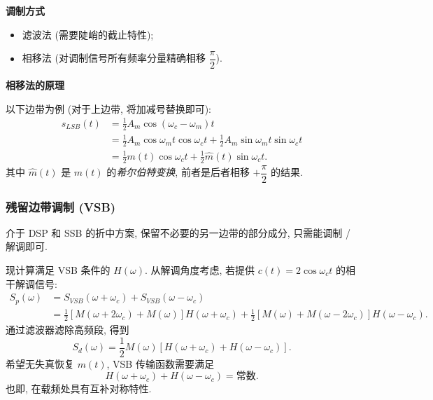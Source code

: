 \textbf{调制方式}
\begin{itemize}
    \item 滤波法 (需要陡峭的截止特性);
    \item 相移法 (对调制信号所有频率分量精确相移 $\dfrac{\pi}{2}$).
\end{itemize}

\textbf{相移法的原理}

以下边带为例 (对于上边带, 将加减号替换即可):
\begin{equation}
    \begin{aligned}
        s_{LSB}(t) & =\frac{1}{2}A_m\cos(\omega_c-\omega_m)t                                            \\
                   & =\frac{1}{2}A_m\cos\omega_mt\cos\omega_ct+\frac{1}{2}A_m\sin\omega_mt\sin\omega_ct \\
                   & =\frac{1}{2}m(t)\cos\omega_ct+\frac{1}{2}\hat{m}(t)\sin\omega_ct.
    \end{aligned}
\end{equation}
其中 $\hat{m}(t)$ 是 $m(t)$ 的\textit{希尔伯特变换}, 前者是后者相移 $+\dfrac{\pi}{2}$ 的结果.

\subsubsection{残留边带调制 (VSB)}
介于 DSP 和 SSB 的折中方案, 保留不必要的另一边带的部分成分, 只需能调制 / 解调即可.

现计算满足 VSB 条件的 $H(\omega)$. 从解调角度考虑, 若提供 $c(t)=2\cos\omega_ct$ 的相干解调信号:
\begin{equation}
    \begin{aligned}
        S_p(\omega) & =S_{VSB}(\omega+\omega_c)+S_{VSB}(\omega-\omega_c)                                                                          \\
                    & =\frac{1}{2}[M(\omega+2\omega_c)+M(\omega)]H(\omega+\omega_c)+\frac{1}{2}[M(\omega)+M(\omega-2\omega_c)]H(\omega-\omega_c).
    \end{aligned}
\end{equation}
通过滤波器滤除高频段, 得到
\begin{equation}
    S_d(\omega)=\frac{1}{2}M(\omega)[H(\omega+\omega_c)+H(\omega-\omega_c)].
\end{equation}
希望无失真恢复 $m(t)$, VSB 传输函数需要满足
\begin{equation}
    H(\omega+\omega_c)+H(\omega-\omega_c)=\text{常数}.
\end{equation}
也即, 在载频处具有互补对称特性.

